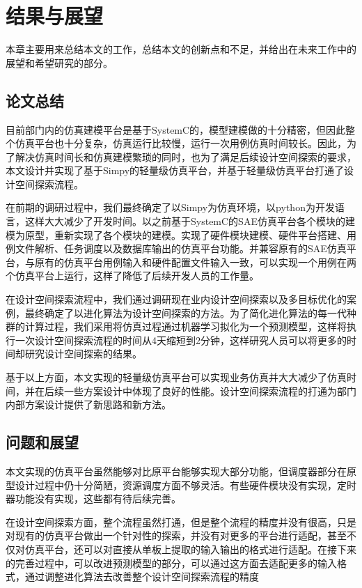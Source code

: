 
\chapter{结果与展望}

本章主要用来总结本文的工作，总结本文的创新点和不足，并给出在未来工作中的展望和希望研究的部分。

\section{论文总结}

目前部门内的仿真建模平台是基于SystemC的，模型建模做的十分精密，但因此整个仿真平台也十分复杂，仿真运行比较慢，运行一次用例仿真时间较长。因此，为了解决仿真时间长和仿真建模繁琐的同时，也为了满足后续设计空间探索的要求，本文设计并实现了基于Simpy的轻量级仿真平台，并基于轻量级仿真平台打通了设计空间探索流程。

在前期的调研过程中，我们最终确定了以Simpy为仿真环境，以python为开发语言，这样大大减少了开发时间。以之前基于SystemC的SAE仿真平台各个模块的建模为原型，重新实现了各个模块的建模。实现了硬件模块建模、硬件平台搭建、用例文件解析、任务调度以及数据库输出的仿真平台功能。并兼容原有的SAE仿真平台，与原有的仿真平台用例输入和硬件配置文件输入一致，可以实现一个用例在两个仿真平台上运行，这样了降低了后续开发人员的工作量。

在设计空间探索流程中，我们通过调研现在业内设计空间探索以及多目标优化的案例，最终确定了以进化算法为设计空间探索的方法。为了简化进化算法的每一代种群的计算过程，我们采用将仿真过程通过机器学习拟化为一个预测模型，这样将执行一次设计空间探索流程的时间从4天缩短到2分钟，这样研究人员可以将更多的时间却研究设计空间探索的结果。

基于以上方面，本文实现的轻量级仿真平台可以实现业务仿真并大大减少了仿真时间，并在后续一些方案设计中体现了良好的性能。设计空间探索流程的打通为部门内部方案设计提供了新思路和新方法。

\section{问题和展望}

本文实现的仿真平台虽然能够对比原平台能够实现大部分功能，但调度器部分在原型设计过程中仍十分简陋，资源调度方面不够灵活。有些硬件模块没有实现，定时器功能没有实现，这些都有待后续完善。

在设计空间探索方面，整个流程虽然打通，但是整个流程的精度并没有很高，只是对现有的仿真平台做出一个针对性的探索，并没有对更多的平台进行适配，甚至不仅对仿真平台，还可以对直接从单板上提取的输入输出的格式进行适配。在接下来的完善过程中，可以改进预测模型的部分，可以通过这方面去适配更多的输入格式，通过调整进化算法去改善整个设计空间探索流程的精度
 
